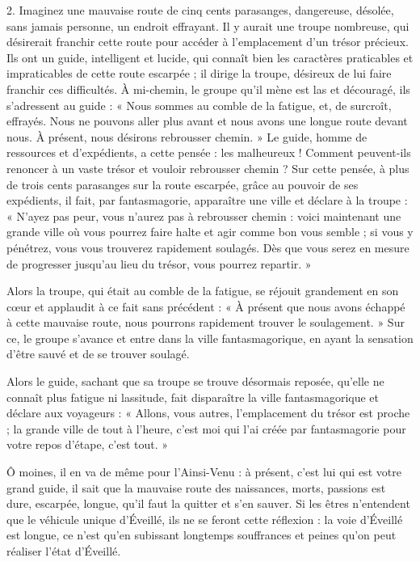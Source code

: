 \begin{singlequote}
    2.	Imaginez une mauvaise route de cinq cents parasanges, dangereuse, désolée, sans jamais personne, un endroit effrayant. Il y aurait une troupe nombreuse, qui désirerait franchir cette route pour accéder à l’emplacement d’un trésor précieux. Ils ont un guide, intelligent et lucide, qui connaît bien les caractères praticables et impraticables de cette route escarpée ; il dirige la troupe, désireux de lui faire franchir ces difficultés. À mi-chemin, le groupe qu’il mène est las et découragé, ils s’adressent au guide : « Nous sommes au comble de la fatigue, et, de surcroît, effrayés. Nous ne pouvons aller plus avant et nous avons une longue route devant nous. À présent, nous désirons rebrousser chemin. » Le guide, homme de ressources et d’expédients, a cette pensée : les malheureux ! Comment peuvent-ils renoncer à un vaste trésor et vouloir rebrousser chemin ? Sur cette pensée, à plus de trois cents parasanges sur la route escarpée, grâce au pouvoir de ses expédients, il fait, par fantasmagorie, apparaître une ville et déclare à la troupe : « N’ayez pas peur, vous n’aurez pas à rebrousser chemin : voici maintenant une grande ville où vous pourrez faire halte et agir comme bon vous semble ; si vous y pénétrez, vous vous trouverez rapidement soulagés. Dès que vous serez en mesure de progresser jusqu’au lieu du trésor, vous pourrez repartir. »

Alors la troupe, qui était au comble de la fatigue, se réjouit grandement en son cœur et applaudit à ce fait sans précédent : « À présent que nous avons échappé à cette mauvaise route, nous pourrons rapidement trouver le soulagement. » Sur ce, le groupe s’avance et entre dans la ville fantasmagorique, en ayant la sensation d’être sauvé et de se trouver soulagé.
 
Alors le guide, sachant que sa troupe se trouve désormais reposée, qu’elle ne connaît plus fatigue ni lassitude, fait disparaître la ville fantasmagorique et déclare aux voyageurs : « Allons, vous autres, l’emplacement du trésor est proche ; la grande ville de tout à l’heure, c’est moi qui l’ai créée par fantasmagorie pour votre repos d’étape, c’est tout. »

Ô moines, il en va de même pour l’Ainsi-Venu : à présent, c’est lui qui est votre grand guide, il sait que la mauvaise route des naissances, morts, passions est dure, escarpée, longue, qu’il faut la quitter et s’en sauver. Si les êtres n’entendent que le véhicule unique d’Éveillé, ils ne se feront cette réflexion : la voie d’Éveillé est longue, ce n’est qu’en subissant longtemps souffrances et peines qu’on peut réaliser l’état d’Éveillé.


\end{singlequote}
